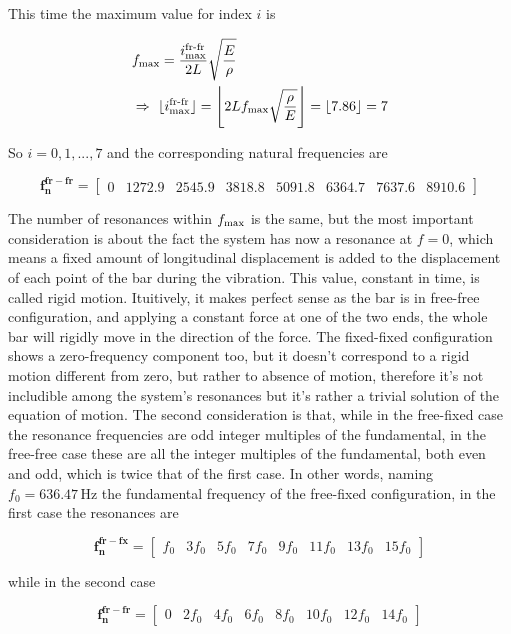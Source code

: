 \documentclass[a4paper,12pt,oneside]{article}
\begin{document}
This time the maximum value for index $ i $ is

\[ \begin{split}
	& f_\textup{max} = \frac{i^\textup{fr-fr}_\textup{max}}{2L} %
		\sqrt{\frac{E}{\rho}} \\
	& \Rightarrow ~ \lfloor i^\textup{fr-fr}_\textup{max} \rfloor = %
		\Biggl\lfloor 2 L f_\textup{max} \sqrt{\frac{\rho}{E}} \Biggr\rfloor = %
		\lfloor 7.86 \rfloor = 7
\end{split} \]

So $ i = 0,1,...,7 $ and the corresponding natural frequencies are

\[
	\mathbf{f_n^{fr-fr}} =	\begin{bmatrix}
																	0					& 1272.9	& 2545.9	& 3818.8 %
																	& 5091.8	& 6364.7	& 7637.6	& 8910.6
													\end{bmatrix}
\]

The number of resonances within $ f_\textup{max} $ is the same, but the most important consideration is about the fact the system has now a resonance at $ f = 0 $, which means a fixed amount of longitudinal displacement is added to the displacement of each point of the bar during the vibration. This value, constant in time, is called rigid motion. Ituitively, it makes perfect sense as the bar is in free-free configuration, and applying a constant force at one of the two ends, the whole bar will rigidly move in the direction of the force. The fixed-fixed configuration shows a zero-frequency component too, but it doesn't correspond to a rigid motion different from zero, but rather to absence of motion, therefore it's not includible among the system's resonances but it's rather a trivial solution of the equation of motion. The second consideration is that, while in the free-fixed case the resonance frequencies are odd integer multiples of the fundamental, in the free-free case these are all the integer multiples of the fundamental, both even and odd, which is twice that of the first case. In other words, naming $ f_0 = 636.47 \, \text{Hz} $ the fundamental frequency of the free-fixed configuration, in the first case the resonances are

\[
	\mathbf{f_n^{fr-fx}} =	\begin{bmatrix}
														f_0	& 3f_0	& 5f_0	& 7f_0	& 9f_0	& 11f_0	& 13f_0	& 15f_0
													\end{bmatrix}
\]

while in the second case

\[
	\mathbf{f_n^{fr-fr}} =	\begin{bmatrix}
														0	& 2f_0	& 4f_0	& 6f_0	& 8f_0	& 10f_0	& 12f_0	& 14f_0
													\end{bmatrix}
\]
\end{document}
